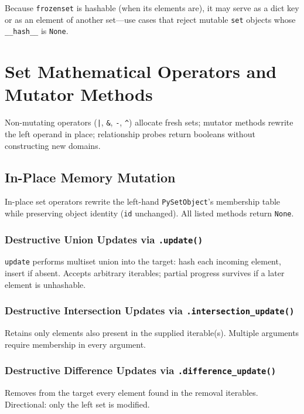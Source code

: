 \documentclass[a4paper,twoside]{report}
\begin{document}
Because \texttt{frozenset} is hashable (when its elements are), it may serve as a dict key or as an element of another set---use cases that reject mutable \texttt{set} objects whose \texttt{\_\_hash\_\_} is \texttt{None}.


\section{Set Mathematical Operators and Mutator Methods}

Non-mutating operators (\texttt{|}, \texttt{\&}, \texttt{-}, \texttt{\textasciicircum{}}) allocate fresh sets; mutator methods rewrite the left operand in place; relationship probes return booleans without constructing new domains.




\subsection{In-Place Memory Mutation}

In-place set operators rewrite the left-hand \texttt{PySetObject}'s membership table while preserving object identity (\texttt{id} unchanged). All listed methods return \texttt{None}.

\subsubsection{Destructive Union Updates via \texttt{.update()}}

\texttt{update} performs multiset union into the target: hash each incoming element, insert if absent. Accepts arbitrary iterables; partial progress survives if a later element is unhashable.

\subsubsection{Destructive Intersection Updates via \texttt{.intersection\_update()}}

Retains only elements also present in the supplied iterable(s). Multiple arguments require membership in every argument.

\subsubsection{Destructive Difference Updates via \texttt{.difference\_update()}}

Removes from the target every element found in the removal iterables. Directional: only the left set is modified.
\end{document}
